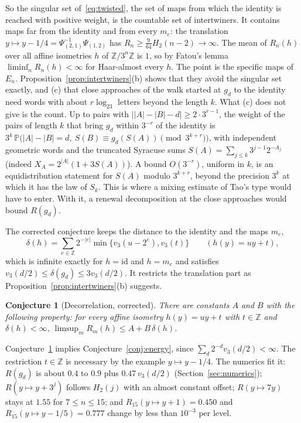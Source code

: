 \documentclass[11pt]{article}
\newtheorem{conjecture}[theorem]{Conjecture}
\theoremstyle{remark}
\newcommand{\Z}{\mathbb Z}
\newcommand{\Prob}{\mathbb P}
\begin{document}
So the singular set of~\eqref{eq:twisted}, the set of maps from which the identity is reached with positive weight, is the countable set of intertwiners. It contains maps far from the identity and from every $m_e$: the translation $y\mapsto y-1/4=\Psi_{(2,1)}^{-1}\Psi_{(1,2)}$ has $R_n\ge\frac9{64}H_2(n-2)\to\infty$. The mean of $R_n(h)$ over all affine isometries $h$ of $\Z/3^n\Z$ is $1$, so by Fatou's lemma $\liminf_nR_n(h)<\infty$ for Haar-almost every $h$. The point is the specific maps of $E_n$. Proposition~\ref{prop:intertwiners}(b) shows that they avoid the singular set exactly, and (c) that close approaches of the walk started at $g_d$ to the identity need words with about $r\log_23$ letters beyond the length $k$. What (c) does not give is the count. Up to pairs with $\bigl||A|-|B|-d\bigr|\ge2\cdot3^{r-1}$, the weight of the pairs of length $k$ that bring $g_d$ within $3^{-r}$ of the identity is $3^k\,\Prob\bigl(|A|-|B|=d,\ S(B)\equiv g_d(S(A))\pmod{3^{k+r}}\bigr)$, with independent geometric words and the truncated Syracuse sums $S(A)=\sum_{j\le k}3^{j-1}2^{-A_j}$ (indeed $X_A=2^{|A|}(1+3S(A))$). A bound $O(3^{-r})$, uniform in $k$, is an equidistribution statement for $S(A)$ modulo $3^{k+r}$, beyond the precision $3^k$ at which it has the law of $S_k$. This is where a mixing estimate of Tao's type \cite[Prop.~1.14, 1.17]{Tao} would have to enter. With it, a renewal decomposition at the close approaches would bound $R(g_d)$.

The corrected conjecture keeps the distance to the identity and the maps $m_e$,
\begin{equation}\label{eq:delta}
 \delta(h)=\sum_{e\in\Z}2^{-|e|}\min\{v_3(u-2^e),v_3(t)\}\qquad(h(y)=uy+t),
\end{equation}
which is infinite exactly for $h=\mathrm{id}$ and $h=m_e$ and satisfies $v_3(d/2)\le\delta(g_d)\le3v_3(d/2)$. It restricts the translation part as Proposition~\ref{prop:intertwiners}(b) suggests.

\begin{conjecture}[Decorrelation, corrected]\label{conj:decor}
There are constants $A$ and $B$ with the following property: for every affine isometry $h(y)=uy+t$ with $t\in\Z$ and $\delta(h)<\infty$, $\limsup_mR_m(h)\le A+B\,\delta(h)$.
\end{conjecture}

Conjecture~\ref{conj:decor} implies Conjecture~\ref{conj:energy}, since $\sum_d2^{-d}v_3(d/2)<\infty$. The restriction $t\in\Z$ is necessary by the example $y\mapsto y-1/4$. The numerics fit it: $R(g_d)$ is about $0.4$ to $0.9$ plus $0.47\,v_3(d/2)$ (Section~\ref{sec:numerics}); $R(y\mapsto y+3^j)$ follows $H_2(j)$ with an almost constant offset; $R(y\mapsto7y)$ stays at $1.55$ for $7\le n\le15$; and $R_{15}(y\mapsto y+1)=0.450$ and $R_{15}(y\mapsto y-1/5)=0.777$ change by less than $10^{-3}$ per level.
\end{document}
